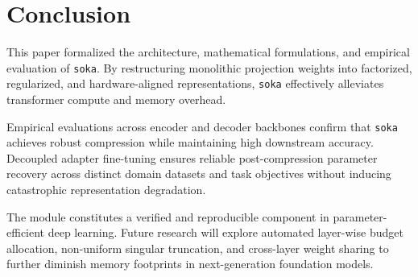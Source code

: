 \section{Conclusion}
This paper formalized the architecture, mathematical formulations, and empirical evaluation of \texttt{soka}. By restructuring monolithic projection weights into factorized, regularized, and hardware-aligned representations, \texttt{soka} effectively alleviates transformer compute and memory overhead.

Empirical evaluations across encoder and decoder backbones confirm that \texttt{soka} achieves robust compression while maintaining high downstream accuracy. Decoupled adapter fine-tuning ensures reliable post-compression parameter recovery across distinct domain datasets and task objectives without inducing catastrophic representation degradation.

The module constitutes a verified and reproducible component in parameter-efficient deep learning. Future research will explore automated layer-wise budget allocation, non-uniform singular truncation, and cross-layer weight sharing to further diminish memory footprints in next-generation foundation models.
